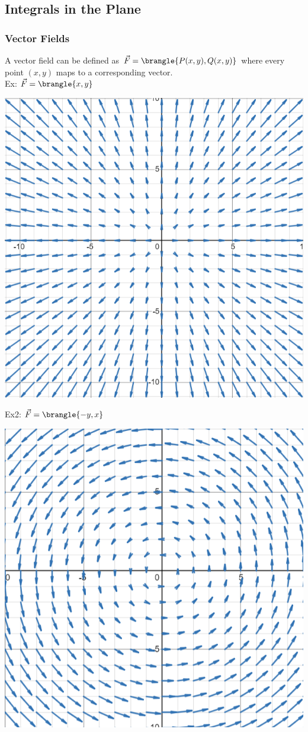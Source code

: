 \subsection{Integrals in the Plane}
\subsubsection{Vector Fields}
A vector field can be defined as $\vec{F}=\brangle{P(x,y),Q(x,y)}$ where every point $(x,y)$ maps to a corresponding vector.\\
Ex: $\vec{F}=\brangle{x,y}$\\
\centerline{\includegraphics[scale=0.6]{Images/Math217Pictures/vectorFieldEx1.png}}
Ex2: $\vec{F}=\brangle{-y,x}$\\
\centerline{\includegraphics[scale=0.6]{Images/Math217Pictures/vectorFieldEx2.png}}
